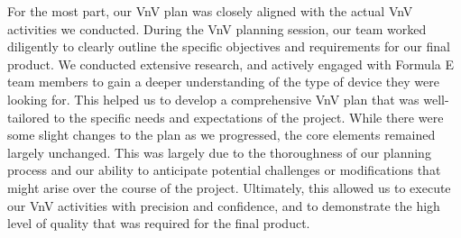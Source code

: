\documentclass[12pt, titlepage]{article}
\begin{document}
\begin{enumerate}
  For the most part, our VnV plan was closely aligned with the actual VnV activities we conducted. During the VnV planning session, our team worked diligently to clearly outline the specific objectives and requirements for our final product. We conducted extensive research, and actively engaged with Formula E team members to gain a deeper understanding of the type of device they were looking for. This helped us to develop a comprehensive VnV plan that was well-tailored to the specific needs and expectations of the project. While there were some slight changes to the plan as we progressed, the core elements remained largely unchanged. This was largely due to the thoroughness of our planning process and our ability to anticipate potential challenges or modifications that might arise over the course of the project. Ultimately, this allowed us to execute our VnV activities with precision and confidence, and to demonstrate the high level of quality that was required for the final product.


\end{enumerate}
\end{document}
